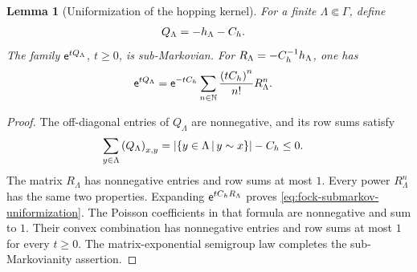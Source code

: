 \documentclass[11pt,a4paper]{article}
\theoremstyle{plain}
\newtheorem{lem}[thm]{Lemma}
\theoremstyle{definition}
\theoremstyle{remark}
\begin{document}
\begin{lem}[Uniformization of the hopping kernel]\label{lem:fock-submarkov-uniformization}
For a finite $\Lambda\Subset\Gamma$, define
\begin{equation}
\begin{aligned}
Q_{\Lambda}
& =
-\physham[h]_{\Lambda}-C_h.
\end{aligned}
\label{eq:fock-killed-generator}
\end{equation}
The family $\mathsf{e}^{tQ_{\Lambda}}$, $t\geq0$, is sub-Markovian.
For $R_{\Lambda}=-C_h^{-1}\physham[h]_{\Lambda}$, one has
\begin{equation}
\begin{aligned}
\mathsf{e}^{tQ_{\Lambda}}
& =
\mathsf{e}^{-tC_h}
\sum_{n\in\mathbb{N}}
\frac{\left( tC_h \right)^{n}}{n!}R_{\Lambda}^{n}.
\end{aligned}
\label{eq:fock-submarkov-uniformization}
\end{equation}
\end{lem}

\begin{proof}
The off-diagonal entries of $Q_{\Lambda}$ are nonnegative, and its row sums satisfy
$$\begin{aligned}
\sum_{y\in\Lambda}\left( Q_{\Lambda} \right)_{x,y}
& =
\left| \left\{y\in\Lambda \, \middle| \, y\sim x\right\} \right|-C_h
\leq
0.
\end{aligned}$$
The matrix $R_{\Lambda}$ has nonnegative entries and row sums at most $1$.
Every power $R_{\Lambda}^{n}$ has the same two properties.
Expanding $\mathsf{e}^{tC_hR_{\Lambda}}$ proves
\eqref{eq:fock-submarkov-uniformization}.
The Poisson coefficients in that formula are nonnegative and sum to $1$.
Their convex combination has nonnegative entries and row sums at most $1$ for every $t\geq0$.
The matrix-exponential semigroup law completes the sub-Markovianity assertion.
\end{proof}
\end{document}
